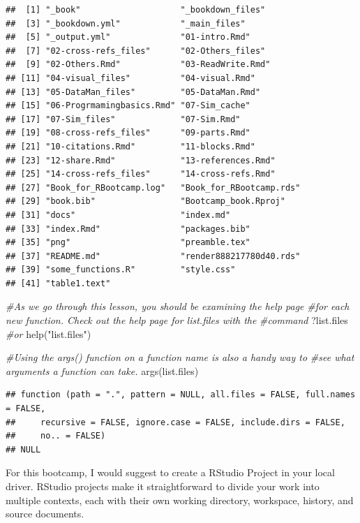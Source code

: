 \documentclass[
]{book}
\newenvironment{Shaded}{\begin{snugshade}}{\end{snugshade}}
\newcommand{\CommentTok}[1]{\textcolor[rgb]{0.56,0.35,0.01}{\textit{#1}}}
\newcommand{\FunctionTok}[1]{\textcolor[rgb]{0.00,0.00,0.00}{#1}}
\newcommand{\NormalTok}[1]{#1}
\newcommand{\StringTok}[1]{\textcolor[rgb]{0.31,0.60,0.02}{#1}}
\theoremstyle{definition}
\theoremstyle{definition}
\theoremstyle{definition}
\theoremstyle{definition}
\theoremstyle{remark}
\begin{document}
\begin{verbatim}
##  [1] "_book"                    "_bookdown_files"         
##  [3] "_bookdown.yml"            "_main_files"             
##  [5] "_output.yml"              "01-intro.Rmd"            
##  [7] "02-cross-refs_files"      "02-Others_files"         
##  [9] "02-Others.Rmd"            "03-ReadWrite.Rmd"        
## [11] "04-visual_files"          "04-visual.Rmd"           
## [13] "05-DataMan_files"         "05-DataMan.Rmd"          
## [15] "06-Progrmamingbasics.Rmd" "07-Sim_cache"            
## [17] "07-Sim_files"             "07-Sim.Rmd"              
## [19] "08-cross-refs_files"      "09-parts.Rmd"            
## [21] "10-citations.Rmd"         "11-blocks.Rmd"           
## [23] "12-share.Rmd"             "13-references.Rmd"       
## [25] "14-cross-refs_files"      "14-cross-refs.Rmd"       
## [27] "Book_for_RBootcamp.log"   "Book_for_RBootcamp.rds"  
## [29] "book.bib"                 "Bootcamp_book.Rproj"     
## [31] "docs"                     "index.md"                
## [33] "index.Rmd"                "packages.bib"            
## [35] "png"                      "preamble.tex"            
## [37] "README.md"                "render888217780d40.rds"  
## [39] "some_functions.R"         "style.css"               
## [41] "table1.text"
\end{verbatim}

\begin{Shaded}
\begin{Highlighting}[]
\CommentTok{\#As we go through this lesson, you should be examining the help page }
\CommentTok{\#for each new function. Check out the help page for list.files with the}
\CommentTok{\#command}
\NormalTok{?list.files}
\CommentTok{\#or}
\FunctionTok{help}\NormalTok{(}\StringTok{"list.files"}\NormalTok{)}

\CommentTok{\#Using the args() function on a function name is also a handy way to }
\CommentTok{\#see what arguments a function can take.}
\FunctionTok{args}\NormalTok{(list.files)}
\end{Highlighting}
\end{Shaded}

\begin{verbatim}
## function (path = ".", pattern = NULL, all.files = FALSE, full.names = FALSE, 
##     recursive = FALSE, ignore.case = FALSE, include.dirs = FALSE, 
##     no.. = FALSE) 
## NULL
\end{verbatim}

For this bootcamp, I would suggest to create a RStudio Project in your local driver. RStudio projects make it straightforward to divide your work into multiple contexts, each with their own working directory, workspace, history, and source documents.
\end{document}
